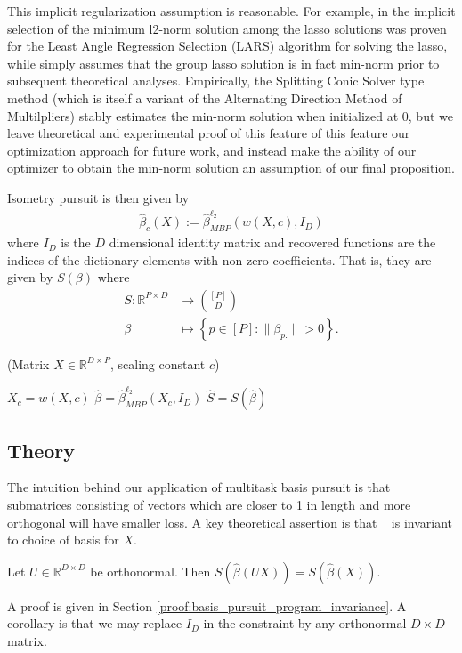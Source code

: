 This implicit regularization assumption is reasonable.
For example, in \citet{Tibshirani2012-vw} the implicit selection of the minimum l2-norm solution among the lasso solutions was proven for the Least Angle Regression Selection (LARS) algorithm for solving the lasso, while \citet{Mishkin2022-yf} simply assumes that the group lasso solution is in fact min-norm prior to subsequent theoretical analyses.
Empirically, the Splitting Conic Solver type method (which is itself a variant of the Alternating Direction Method of Multilpliers) stably estimates the min-norm solution when initialized at $0$, but we leave theoretical and experimental proof of this feature of this feature our optimization approach for future work, and instead make the ability of our optimizer to obtain the min-norm solution an assumption of our final proposition.

Isometry pursuit is then given by
\begin{align}
\label{prog:isometry_pursuit}
\widehat \beta_c ( X) := \widehat \beta_{MBP}^{\ell_2} ( w(X,c), I_D )
\end{align}
where $I_D$ is the $D$ dimensional identity matrix and recovered functions are the indices of the dictionary elements with non-zero coefficients.
That is, they are given by $S(\beta)$ where
\begin{align}
S: \mathbb{R}^{P \times D} &\to \binom{[P]}{D} \\
\beta &\mapsto \left\{ p \in [P] :  \|\beta_{p.}\| > 0 \right\}.
\end{align}
\begin{algorithm}[H]
\caption{\isometrypursuit(Matrix ${X} \in \mathbb{R}^{D \times P}$, scaling constant $c$)}
\begin{algorithmic}[1]
 $X_c = w({X},c)$
 $\widehat \beta = \widehat \beta_{MBP}^{\ell_2} (X_c, I_D)$
 $\widehat{S} = S (\widehat \beta)$
\end{algorithmic}
\end{algorithm}

\subsection{Theory}

The intuition behind our application of multitask basis pursuit is that submatrices consisting of vectors which are closer to 1 in length and more orthogonal will have smaller loss.
A key theoretical assertion is that \isometrypursuit~ is invariant to choice of basis for $ X$.
\begin{proposition}
\label{prop:basis_pursuit_selection_invariance}
Let $U \in \mathbb R^{D \times D}$ be orthonormal.
Then $S(\widehat \beta  (U  X)) = S(\widehat \beta ( X))$.
\end{proposition}
A proof is given in Section \ref{proof:basis_pursuit_program_invariance}.
A corollary is that we may replace $I_D$ in the constraint by any orthonormal $D \times D$ matrix.

